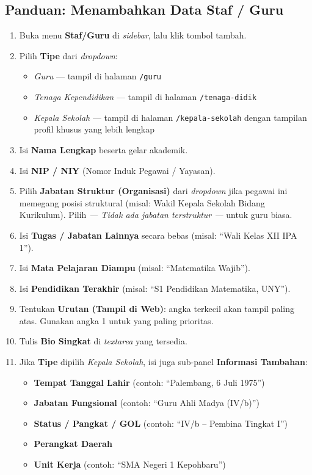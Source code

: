 \subsection{Panduan: Menambahkan Data Staf / Guru}

\begin{enumerate}
  \item Buka menu \textbf{Staf/Guru} di \textit{sidebar}, lalu klik tombol tambah.
  \item Pilih \textbf{Tipe} dari \textit{dropdown}:
        \begin{itemize}
          \item \textit{Guru} --- tampil di halaman \texttt{/guru}
          \item \textit{Tenaga Kependidikan} --- tampil di halaman \texttt{/tenaga-didik}
          \item \textit{Kepala Sekolah} --- tampil di halaman \texttt{/kepala-sekolah}
                dengan tampilan profil khusus yang lebih lengkap
        \end{itemize}
  \item Isi \textbf{Nama Lengkap} beserta gelar akademik.
  \item Isi \textbf{NIP / NIY} (Nomor Induk Pegawai / Yayasan).
  \item Pilih \textbf{Jabatan Struktur (Organisasi)} dari \textit{dropdown} jika pegawai ini
        memegang posisi struktural (misal: Wakil Kepala Sekolah Bidang Kurikulum).
        Pilih \textit{--- Tidak ada jabatan terstruktur ---} untuk guru biasa.
  \item Isi \textbf{Tugas / Jabatan Lainnya} secara bebas (misal: ``Wali Kelas XII IPA 1'').
  \item Isi \textbf{Mata Pelajaran Diampu} (misal: ``Matematika Wajib'').
  \item Isi \textbf{Pendidikan Terakhir} (misal: ``S1 Pendidikan Matematika, UNY'').
  \item Tentukan \textbf{Urutan (Tampil di Web)}: angka terkecil akan tampil paling atas.
        Gunakan angka 1 untuk yang paling prioritas.
  \item Tulis \textbf{Bio Singkat} di \textit{textarea} yang tersedia.

  \item Jika \textbf{Tipe} dipilih \textit{Kepala Sekolah}, isi juga sub-panel
        \textbf{Informasi Tambahan}:
        \begin{itemize}
          \item \textbf{Tempat Tanggal Lahir} (contoh: ``Palembang, 6 Juli 1975'')
          \item \textbf{Jabatan Fungsional} (contoh: ``Guru Ahli Madya (IV/b)'')
          \item \textbf{Status / Pangkat / GOL} (contoh: ``IV/b -- Pembina Tingkat I'')
          \item \textbf{Perangkat Daerah}
          \item \textbf{Unit Kerja} (contoh: ``SMA Negeri 1 Kepohbaru'')
        \end{itemize}


\end{enumerate}
